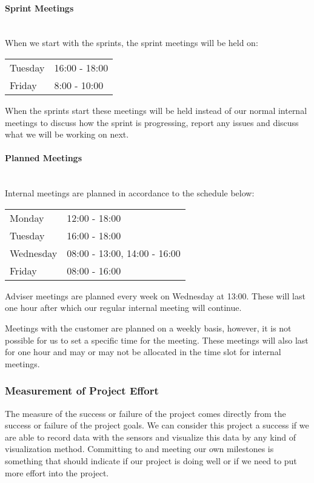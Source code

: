 \documentclass[../document.tex]{subfiles}
\begin{document}
\paragraph{Sprint Meetings} \ \\
When we start with the sprints, the sprint meetings will be held on:
\begin{table}[H]
\begin{tabular}{ll}
\hline
Tuesday	&	16:00 - 18:00 \\
Friday		&	8:00 - 10:00 \\
\hline
\end{tabular}
\end{table}
When the sprints start these meetings will be held instead of our normal internal meetings to discuss how the sprint is progressing, report any issues and discuss what we will be working on next.

\paragraph{Planned Meetings} \ \\
Internal meetings are planned in accordance to the schedule below:
\begin{table}[H]
\begin{tabular}{ll}
\hline
Monday 	&	12:00 - 18:00 \\
Tuesday 	&	16:00 - 18:00 \\
Wednesday 	&	08:00 - 13:00, 14:00 - 16:00 \\
Friday 	&	08:00 - 16:00 \\
\hline
\end{tabular}
\end{table}
Adviser meetings are planned every week on Wednesday at 13:00. These will last one hour after which our regular internal meeting will continue.

Meetings with the customer are planned on a weekly basis, however, it is not possible for us to set a specific time for the meeting. These meetings will also last for one hour and may or may not be allocated in the time slot for internal meetings.

\subsubsection{Measurement of Project Effort}
The measure of the success or failure of the project comes directly from the success or failure of the project goals. We can consider this project a success if we are able to record data with the sensors and visualize this data by any kind of visualization method. Committing to and meeting our own milestones is something that should indicate if our project is doing well or if we need to put more effort into the project.
\end{document}
